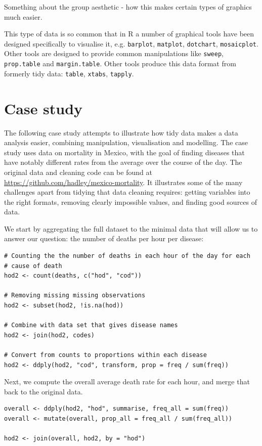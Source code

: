 \documentclass[oneside]{article}
\begin{document}
Something about the group aesthetic - how this makes certain types of graphics much easier.

This type of data is so common that in R a number of graphical tools have been designed specifically to visualise it, e.g. {\tt barplot}, {\tt matplot}, {\tt dotchart}, {\tt mosaicplot}. Other tools are designed to provide common manipulations like {\tt sweep}, {\tt prop.table} and {\tt margin.table}. Other tools produce this data format from formerly tidy data: {\tt table}, {\tt xtabs}, {\tt tapply}.

\section{Case study} 

The following case study attempts to illustrate how tidy data makes a data analysis easier, combining manipulation, visualisation and modelling. The case study uses data on mortality in Mexico, with the goal of finding diseases that have notably different rates from the average over the course of the day. The original data and cleaning code can be found at \url{https://github.com/hadley/mexico-mortality}. It illustrates some of the many challenges apart from tidying that data cleaning requires: getting variables into the right formats, removing clearly impossible values, and finding good sources of data.

We start by aggregating the full dataset to the minimal data that will allow us to answer our question: the number of deaths per hour per disease:

\begin{verbatim}
# Counting the the number of deaths in each hour of the day for each 
# cause of death
hod2 <- count(deaths, c("hod", "cod"))

# Removing missing missing observations
hod2 <- subset(hod2, !is.na(hod))

# Combine with data set that gives disease names
hod2 <- join(hod2, codes)

# Convert from counts to proportions within each disease
hod2 <- ddply(hod2, "cod", transform, prop = freq / sum(freq))
\end{verbatim}

Next, we compute the overall average death rate for each hour, and merge that back to the original data.

\begin{verbatim}
overall <- ddply(hod2, "hod", summarise, freq_all = sum(freq))
overall <- mutate(overall, prop_all = freq_all / sum(freq_all))

hod2 <- join(overall, hod2, by = "hod")
\end{verbatim}
\end{document}
